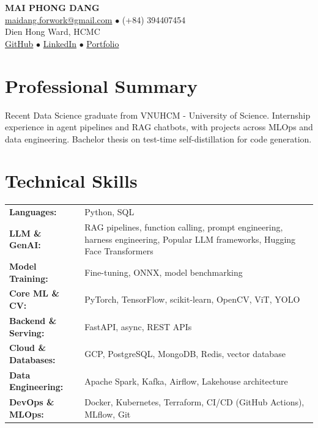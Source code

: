 \documentclass[a4paper,10pt]{article}
\begin{document}
\begin{center}
  {\LARGE\bfseries MAI PHONG DANG} \\[0.2em]
  \href{mailto:maidang.forwork@gmail.com}{\color{darkblue}maidang.forwork@gmail.com} $\bullet$ (+84) 394407454 \\[0.1em]
  Dien Hong Ward, HCMC \\[0.1em]
  \href{https://github.com/theAbyssOfTime2004}{\color{darkblue}GitHub} $\bullet$
  \href{https://www.linkedin.com/in/mai-%C4%91%C4%83ng-124b13302/}{\color{darkblue}LinkedIn} $\bullet$
  \href{https://theabyssoftime2004.github.io/}{\color{darkblue}Portfolio}
\end{center}

\vspace{-0.1em}

\section{Professional Summary}
Recent Data Science graduate from VNUHCM - University of Science. Internship experience in agent pipelines and RAG chatbots, with projects across MLOps and data engineering. Bachelor thesis on test-time self-distillation for code generation.

\section{Technical Skills}
\begin{tabularx}{\textwidth}{@{}l >{\raggedright\arraybackslash}X@{}}
\textbf{Languages:} & Python, SQL \\
\textbf{LLM \& GenAI:} & RAG pipelines, function calling, prompt engineering, harness engineering, Popular LLM frameworks, Hugging Face Transformers \\
\textbf{Model Training:} & Fine-tuning, ONNX, model benchmarking \\
\textbf{Core ML \& CV:} & PyTorch, TensorFlow, scikit-learn, OpenCV, ViT, YOLO \\
\textbf{Backend \& Serving:} & FastAPI, async, REST APIs \\
\textbf{Cloud \& Databases:} & GCP, PostgreSQL, MongoDB, Redis, vector database \\
\textbf{Data Engineering:} & Apache Spark, Kafka, Airflow, Lakehouse architecture \\
\textbf{DevOps \& MLOps:} & Docker, Kubernetes, Terraform, CI/CD (GitHub Actions), MLflow, Git \\
\end{tabularx}
\end{document}
